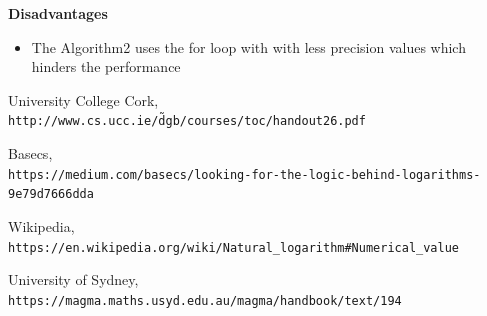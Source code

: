 \documentclass[12pt]{report}
\begin{document}
\textbf{Disadvantages}
\begin{itemize}
   \item The Algorithm2 uses the for loop with with less precision values which hinders the performance
   
\end{itemize}

\begin{thebibliography}{9}
University College Cork,
\\\texttt{http://www.cs.ucc.ie/\~dgb/courses/toc/handout26.pdf}

Basecs,
\\\texttt{https://medium.com/basecs/looking-for-the-logic-behind-logarithms-9e79d7666dda}

Wikipedia,
\\\texttt{https://en.wikipedia.org/wiki/Natural\_logarithm\#Numerical\_value}

University of Sydney,
\\\texttt{https://magma.maths.usyd.edu.au/magma/handbook/text/194}
\end{thebibliography}
\end{document}
